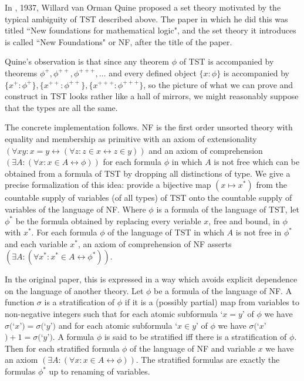 \documentclass[112pt]{article}
\begin{document}
In \cite{nf}, 1937, Willard van Orman Quine proposed a set theory motivated by the typical ambiguity of TST described above.  The paper in which he did this was titled ``New foundations for mathematical logic", and the set theory it introduces is called ``New Foundations" or NF, after the title of the paper.

Quine's observation is that since any theorem $\phi$ of TST is accompanied by theorems $\phi^+, \phi^{++}, \phi^{+++}, \ldots$ and every defined object $\{x:\phi\}$ is accompanied by
$\{x^+:\phi^+\},\{x^{++}:\phi^{++}\},\{x^{+++}:\phi^{+++}\}$, so the picture of what we can prove and construct in TST looks rather like a hall of mirrors, we might reasonably suppose that the types are all the same.

The concrete implementation follows.  NF is the first order unsorted theory with equality and membership as primitive with an axiom of extensionality $(\forall xy:x=y \leftrightarrow (\forall z:z \in x \leftrightarrow z\in y))$ and an axiom of comprehension $(\exists A:(\forall x:x \in A \leftrightarrow \phi))$ for each formula $\phi$ in which $A$ is not free which can be obtained from a formula of TST by dropping all distinctions of type.  We give a precise formalization of this idea:  provide a bijective map $(x \mapsto x^*)$ from the countable supply of variables (of all types) of TST onto the countable supply of variables of the language of NF.  Where $\phi$ is a formula of the language of TST, let $\phi^*$ be the formula obtained by replacing every veriable $x$, free and bound,
in $\phi$ with $x^*$. For each formula $\phi$ of the language of TST in which $A$ is not free in $\phi^*$ and each variable $x^*$, an axiom of comprehension of NF asserts $(\exists A:(\forall x^*:x^* \in A \leftrightarrow \phi^*))$.

In the original paper, this is expressed in a way which avoids explicit dependence on the language of another theory.  Let $\phi$ be a formula of the language of
NF.  A function $\sigma$ is a stratification of $\phi$ if it is a (possibly partial) map from variables to non-negative integers such that for each atomic subformula
`$x=y$'  of $\phi$ we have $\sigma($`$x$'$)=\sigma($`$y$'$)$ and for each atomic subformula `$x \in y$' of $\phi$ we have $\sigma($`$x$'$)+1 = \sigma($`$y$'$)$.
A formula $\phi$ is said to be stratified iff there is a stratification of $\phi$.  Then for each stratified formula $\phi$ of the language of NF and variable $x$ we have an axiom $(\exists A:(\forall x:x \in A \leftrightarrow \phi))$.  The stratified formulas are exactly the formulas $\phi^*$ up to renaming of variables.
\end{document}
